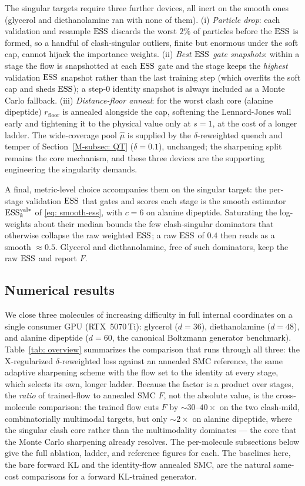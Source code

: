 \documentclass{article}
\begin{document}
The singular targets require three further devices, all inert on the smooth ones (glycerol and diethanolamine
ran with none of them). (i) \emph{Particle drop}: each validation and resample $\mathrm{ESS}$ discards the worst $2\%$
of particles before the $\mathrm{ESS}$ is formed, so a handful of clash-singular outliers, finite but
enormous under the soft cap, cannot hijack the importance weights. (ii) \emph{Best $\mathrm{ESS}$ gate snapshots}:
within a stage the flow is snapshotted at each $\mathrm{ESS}$ gate and the stage keeps the
\emph{highest} validation $\mathrm{ESS}$ snapshot rather than the last training step (which overfits the soft cap and
sheds $\mathrm{ESS}$); a step-$0$ identity snapshot is always included as a Monte Carlo fallback. (iii)
\emph{Distance-floor anneal}: for the worst clash core (alanine dipeptide) $r_{\mathrm{floor}}$ is annealed
alongside the cap, softening the Lennard-Jones wall early and tightening it to the physical value only at
$s = 1$, at the cost of a longer ladder. The wide-coverage pool $\hat\mu$ is supplied by the
$\delta$-reweighted quench and temper of Section~\ref{M-subsec: QT} ($\delta = 0.1$), unchanged; the sharpening split
remains the core mechanism, and these three devices are the supporting engineering the singularity demands.

A final, metric-level choice accompanies them on the singular target: the per-stage validation $\mathrm{ESS}$ that
gates and scores each stage is the smooth estimator $\mathrm{ESS}^{\mathrm{val}*}_k$ of \eqref{eq: smooth-ess}, with
$c = 6$ on alanine dipeptide. Saturating the log-weights about their median bounds the few clash-singular
dominators that otherwise collapse the raw weighted $\mathrm{ESS}$; a raw $\mathrm{ESS}$ of $0.4$ then reads as a smooth
${\approx}0.5$. Glycerol and diethanolamine, free of such dominators, keep the raw $\mathrm{ESS}$ and report $F$.

\subsection{Numerical results}
\label{sec: mol-results}

We close three molecules of increasing difficulty in full internal coordinates on a single consumer GPU
(RTX~5070\,Ti): glycerol ($d = 36$), diethanolamine ($d = 48$), and alanine dipeptide ($d = 60$, the canonical
Boltzmann generator benchmark). Table~\ref{tab: overview} summarizes the comparison that runs through all
three: the X-regularized $\delta$-reweighted loss against an annealed SMC reference, the same adaptive
sharpening scheme with the flow set to the identity at every stage, which selects its own, longer ladder.
Because the factor is a product over stages, the \emph{ratio} of trained-flow to annealed SMC $F$, not the
absolute value, is the cross-molecule comparison: the trained flow cuts $F$ by ${\sim}30$--$40\times$ on the two
clash-mild, combinatorially multimodal targets, but only ${\sim}2\times$ on alanine dipeptide, where the
singular clash core rather than the multimodality dominates --- the core that the Monte Carlo sharpening already resolves. The per-molecule subsections below give the full ablation, ladder, and reference figures for each.
The baselines here, the bare forward KL and the identity-flow annealed SMC, are the natural same-cost
comparisons for a forward KL-trained generator.
\end{document}

